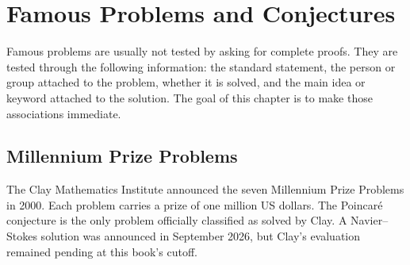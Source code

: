     \chapter{Famous Problems and Conjectures}

    Famous problems are usually not tested by asking for complete proofs. They
    are tested through the following information: the standard statement, the
    person or group attached to the problem, whether it is solved, and the main
    idea or keyword attached to the solution. The goal of this chapter is to
    make those associations immediate.

    \section*{Millennium Prize Problems}

    The Clay Mathematics Institute announced the seven Millennium Prize Problems
    in 2000. Each problem carries a prize of one million US dollars. The
    Poincaré conjecture is the only problem officially classified as solved by
    Clay. A Navier--Stokes solution was announced in September 2026, but Clay's
    evaluation remained pending at this book's cutoff.

    \vspace{1em}

